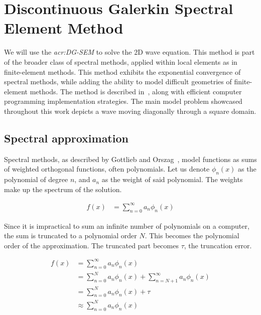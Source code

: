 \chapter{Discontinuous Galerkin Spectral Element Method} \label{chapter:spectral_element_method}

We will use the \textit{\acrfull{acr:DG-SEM}} to solve the 2D wave equation. This method is part of
the broader class of spectral methods, applied within local elements as in finite-element methods.
This method exhibits the exponential convergence of spectral methods, while adding the ability to
model difficult geometries of finite-element methods. The method is described in~\cite{Kopriva2009},
along with efficient computer programming implementation strategies. The main model problem
showcased throughout this work depicts a wave moving diagonally through a square domain.

\section{Spectral approximation} \label{section:spectral_element_method:spectral_approximation}

Spectral methods, as described by Gottlieb and Orszag~\cite{Gottlieb1977}, model functions as sums
of weighted orthogonal functions, often polynomials. Let us denote $\phi_n(x)$ as the polynomial of
degree $n$, and $a_n$ as the weight of said polynomial. The weights make up the spectrum of the
solution.

\begin{equation} \label{equ:infinite_sum}
    \begin{split}
        f(x) & = \sum_{n = 0}^{\infty }a_n \phi_n(x)
    \end{split}
\end{equation}

Since it is impractical to sum an infinite number of polynomials on a computer, the sum is truncated
to a polynomial order $N$. This becomes the polynomial order of the approximation. The truncated
part becomes $\tau$, the truncation error.

\begin{equation} \label{equ:truncated_sum}
    \begin{split}
        f(x) & = \sum_{n = 0}^{\infty }a_n \phi_n(x) \\
        & = \sum_{n = 0}^{N}a_n \phi_n(x) + \sum_{n = N + 1}^{\infty }a_n \phi_n(x) \\
        & = \sum_{n = 0}^{N}a_n \phi_n(x) + \tau \\
        & \approx \sum_{n = 0}^{N}a_n \phi_n(x)
    \end{split}
\end{equation}

